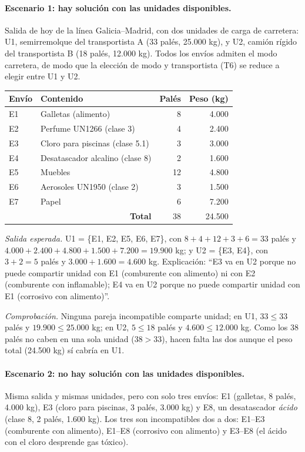 \documentclass[12pt,a4paper,twoside,spanish]{article}      %
\begin{document}
\paragraph{Escenario 1: hay solución con las unidades disponibles.}
Salida de hoy de la línea Galicia--Madrid, con dos unidades de carga de
carretera: U1, semirremolque del transportista A (33 palés, 25.000 kg), y U2,
camión rígido del transportista B (18 palés, 12.000 kg). Todos los envíos
admiten el modo carretera, de modo que la elección de modo y transportista
(T6) se reduce a elegir entre U1 y U2.

{\small
\begin{center}
\begin{tabular}{|l|l|r|r|} \hline
\textbf{Envío} & \textbf{Contenido} & \textbf{Palés} & \textbf{Peso (kg)} \\ \hline\hline
E1 & Galletas (alimento) & 8 & 4.000 \\ \hline
E2 & Perfume UN1266 (clase 3) & 4 & 2.400 \\ \hline
E3 & Cloro para piscinas (clase 5.1) & 3 & 3.000 \\ \hline
E4 & Desatascador alcalino (clase 8) & 2 & 1.600 \\ \hline
E5 & Muebles & 12 & 4.800 \\ \hline
E6 & Aerosoles UN1950 (clase 2) & 3 & 1.500 \\ \hline
E7 & Papel & 6 & 7.200 \\ \hline
\multicolumn{2}{|r|}{\textbf{Total}} & 38 & 24.500 \\ \hline
\end{tabular}
\end{center}
}

\emph{Salida esperada.} U1 = \{E1, E2, E5, E6, E7\}, con $8+4+12+3+6=33$ palés
y $4.000+2.400+4.800+1.500+7.200=19.900$ kg; y U2 = \{E3, E4\}, con $3+2=5$
palés y $3.000+1.600=4.600$ kg. Explicación: ``E3 va en U2 porque no puede
compartir unidad con E1 (comburente con alimento) ni con E2 (comburente con
inflamable); E4 va en U2 porque no puede compartir unidad con E1 (corrosivo
con alimento)''.

\emph{Comprobación.} Ninguna pareja incompatible comparte unidad; en U1,
$33\leq 33$ palés y $19.900\leq 25.000$ kg; en U2, $5\leq 18$ palés y
$4.600\leq 12.000$ kg. Como los 38 palés no caben en una sola unidad
($38>33$), hacen falta las dos aunque el peso total (24.500 kg) sí cabría en U1.

\paragraph{Escenario 2: no hay solución con las unidades disponibles.}
Misma salida y mismas unidades, pero con solo tres envíos: E1 (galletas, 8
palés, 4.000 kg), E3 (cloro para piscinas, 3 palés, 3.000 kg) y E8, un
desatascador \emph{ácido} (clase 8, 2 palés, 1.600 kg). Los tres son
incompatibles dos a dos: E1--E3 (comburente con alimento), E1--E8 (corrosivo
con alimento) y E3--E8 (el ácido con el cloro desprende gas tóxico).
\end{document}
